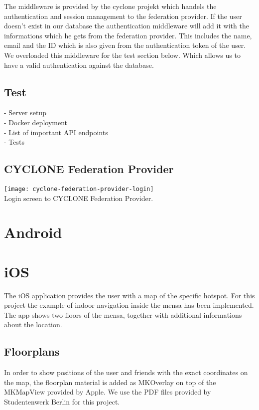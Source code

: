 The middleware is provided by the cyclone projekt which handels the authentication and session management to the federation provider. If the user doesn't exist in our database the authentication middleware will add it with the informations which he gets from the federation provider. This includes the name, email and the ID which is also given from the authentication token of the user. We overloaded this middleware for the test section below. Which allows us to have a valid authentication against the database.

\subsection{Test}

- Server setup\\
- Docker deployment\\
- List of important API endpoints\\
- Tests

\subsection{CYCLONE Federation Provider}
\label{federation-provider}

\begin{center}
    \texttt{[image: cyclone-federation-provider-login]}\\
    Login screen to CYCLONE Federation Provider.
\end{center}


\vspace{0.5cm}

\section{Android}




\vspace{0.5cm}

\section{iOS}


The iOS application provides the user with a map of the specific hotspot. For this project the example of indoor navigation inside the mensa has been implemented. The app shows two floors of the mensa, together with additional informations about the location.

\subsection{Floorplans}
In order to show positions of the user and friends with the exact coordinates on the map, the floorplan material is added as MKOverlay on top of the MKMapView provided by Apple. We use the PDF files provided by Studentenwerk Berlin for this project. 

